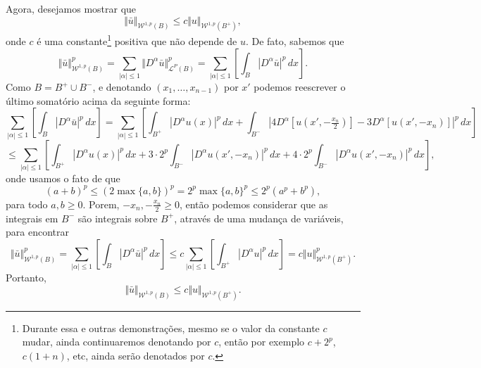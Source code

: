 \documentclass[a4paper, 11pt]{book}
\theoremstyle{definition}
\newcommand{\cL}{\mathcal{L}}
\newcommand{\cW}{\mathcal{W}}
\begin{document}
\begin{prf}
    Agora, desejamos mostrar que 
    \begin{equation} \label{eq:desigualdade-B-Bmais}
        \Vert \bar u \Vert_{\cW^{1,p}(B)} \leqslant c \Vert u \Vert_{\cW^{1,p}(B^+)},
    \end{equation}
    onde $c$ é uma constante\footnote{Durante essa e outras demonstrações, mesmo se o valor da constante $c$ mudar, ainda continuaremos denotando por $c$, então por exemplo $c + 2^p$, $c(1 + n)$, etc, ainda serão denotados por $c$.} positiva que não depende de $u$.
    De fato, sabemos que
    \[
        \Vert \bar u \Vert_{\cW^{1,p}(B)}^p = \sum_{|\alpha| \leqslant 1} \Vert D^\alpha\bar u \Vert_{\cL^P(B)}^p = \sum_{|\alpha| \leqslant 1} \left[\int_B |D^\alpha \bar u| ^p \,dx\right].
    \]
    Como $B = B^+ \cup B^-$, e denotando $(x_1,\dots,x_{n-1})$ por $x'$ podemos reescrever o último somatório acima da seguinte forma:
    \[
        \sum_{|\alpha| \leqslant 1} \left[\int_B |D^\alpha \bar u| ^p \,dx\right] = \sum_{|\alpha| \leqslant 1} \left[ \int_{B^+} |D^\alpha u(x)|^p \,dx + \int_{B^-} |4D^\alpha [u(x',-\tfrac{x_n}{2})] - 3D^\alpha [u(x',-x_n)] |^p \,dx \right]
    \]
    \[
        \leqslant \sum_{|\alpha| \leqslant 1} \left[ \int_{B^+} |D^\alpha u(x)|^p \,dx + 3 \cdot 2^p\int_{B^-} |D^\alpha u(x',-x_n)|^p \,dx + 4 \cdot 2^p\int_{B^-} |D^\alpha u(x',-x_n)|^p \,dx   \right], 
    \]
    onde usamos o fato de que
    \[
        (a + b)^p \leqslant (2 \max\{a,b\})^p = 2^p \max\{a,b\}^p \leqslant 2^p (a^p + b^p),
    \]
    para todo $a,b \geqslant 0$. Porem, $-x_n, -\tfrac{x_n}{2} \geqslant 0$, então podemos considerar que as integrais em $B^-$ são integrais sobre $B^+$, através de uma mudança de variáveis, para encontrar
    \[
        \Vert \bar u \Vert_{\cW^{1,p}(B)}^p = \sum_{|\alpha| \leqslant 1} \left[\int_B |D^\alpha \bar u| ^p \,dx\right] \leqslant c\sum_{|\alpha| \leqslant 1} \left[ \int_{B^+}|D^\alpha u|^p \,dx \right] = c \Vert u \Vert_{\cW^{1,p}(B^+)}^p.
    \]
    Portanto,
    \[
        \Vert \bar u \Vert_{\cW^{1,p}(B)} \leqslant c \Vert u \Vert_{\cW^{1,p}(B^+)}.
    \]


\end{prf}
\end{document}
